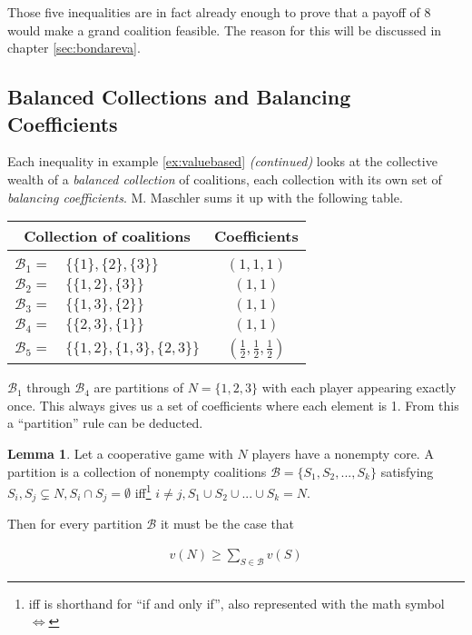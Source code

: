 \documentclass[10pt,a4paper,titlepage]{article}
\theoremstyle{plain}
\theoremstyle{definition}
\newtheorem{lemma}[thm]{Lemma}
\begin{document}
Those five inequalities are in fact already enough to prove that a payoff of 8 would make a grand coalition feasible. The reason for this will be discussed in chapter \ref{sec:bondareva}.




\subsection{Balanced Collections and Balancing Coefficients}
Each inequality in example \ref{ex:valuebased} \textit{(continued)} looks at the collective wealth of a \textit{balanced collection} of coalitions, each collection with its own set of \textit{balancing coefficients}. M. Maschler\cite{maschler} sums it up with the following table.\vspace{8pt}

\begin{tabular}{ | r l | c | }
    \multicolumn{2}{c}{Collection of coalitions} & \multicolumn{1}{c}{Coefficients}\\[2pt]
    \hline & & \\[-8pt]
    $\mathcal{B}_1 =$ & $\{\{1\}, \{2\}, \{3\}\}$ & $(1, 1, 1)$\\[2pt]
    $\mathcal{B}_2 =$ & $\{\{1, 2\}, \{3\}\}$ & $(1, 1)$\\[2pt]
    $\mathcal{B}_3 =$ & $\{\{1, 3\}, \{2\}\}$ & $(1, 1)$\\[2pt]
    $\mathcal{B}_4 =$ & $\{\{2, 3\}, \{1\}\}$ & $(1, 1)$\\[2pt]
    $\mathcal{B}_5 =$ & $\{\{1, 2\}, \{1, 3\}, \{2, 3\}\}$ & $(\frac{1}{2}, \frac{1}{2}, \frac{1}{2})$\\[2pt]
    \hline
\end{tabular}\vspace{8pt}

$\mathcal{B}_1$ through $\mathcal{B}_4$ are partitions of $N = \{1, 2, 3\}$ with each player appearing exactly once. This always gives us a set of coefficients where each element is 1. From this a \enquote{partition} rule can be deducted.

\begin{lemma}
    Let a cooperative game with $N$ players have a nonempty core. A partition is a collection of nonempty coalitions $\mathcal{B} = \{S_1, S_2, ..., S_k\}$ satisfying $S_i, S_j \subsetneq N, S_i \cap S_j = \emptyset$ iff\footnote{iff is shorthand for \enquote{if and only if}, also represented with the math symbol $\Leftrightarrow$} $i \neq j, S_1 \cup S_2 \cup ... \cup S_k = N$.

    Then for every partition $\mathcal{B}$ it must be the case that

    \begin{align}
        v(N) \geq \sum_{S \in \mathcal{B}} v(S)
    \end{align}
\end{lemma}
\end{document}

